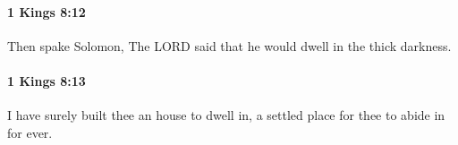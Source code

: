 		\paragraph{1 Kings 8:12} %
			\label{1KINGS-8-12}

			Then spake Solomon, The LORD said that he would dwell in the thick darkness.


		\paragraph{1 Kings 8:13} %
			\label{1KINGS-8-13}

			I have surely built thee an house to dwell in, a settled place for thee to abide in for ever.


